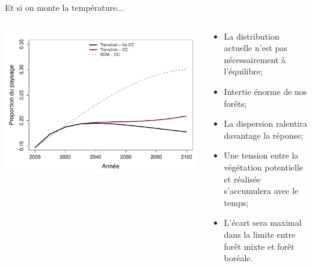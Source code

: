 \documentclass{eecslides}
\begin{document}
%
%



	\begin{frame}{Et si on monte la température...}
		\begin{columns}
			\begin{column}{0.5\textwidth}
				\begin{center}
					\includegraphics[height=0.5\textheight]{CC_MF}
				\end{center}
			\end{column}
			\begin{column}{0.5\textwidth}
				\begin{itemize}
					\item La distribution actuelle n'est pas nécessairement à l'équilibre;
					\item Intertie énorme de nos forêts;
					\item La dispersion ralentira davantage la réponse;
					\item Une tension entre la végétation potentielle et réalisée s'accumulera avec le temps;
					\item L'écart sera maximal dans la limite entre forêt mixte et forêt boréale.
				\end{itemize}
			\end{column}
		\end{columns}	
	\end{frame}
\end{document}
